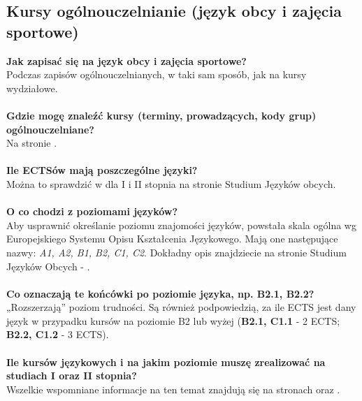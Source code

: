\documentclass[11pt]{article}
\begin{document}
\subsection{Kursy ogólnouczelnianie (język obcy i zajęcia sportowe)}
\textbf{Jak zapisać się na język obcy i zajęcia sportowe?} \\
\indent Podczas zapisów ogólnouczelnianych, w taki sam sposób, jak na kursy wydziałowe. \\\\
\textbf{Gdzie mogę znaleźć kursy (terminy, prowadzących, kody grup) ogólnouczelniane?} \\
\indent Na stronie   
{}. \\\\
\textbf{Ile ECTSów mają poszczególne języki?}\\
\indent Można to sprawdzić w {} dla I i II stopnia na stronie Studium Języków obcych.\\\\
\textbf{O co chodzi z poziomami języków? }\\
\indent Aby usprawnić określanie poziomu znajomości języków, powstała skala ogólna wg Europejskiego Systemu Opisu Kształcenia Językowego. Mają one następujące nazwy: \textit{A1, A2, B1, B2, C1, C2}. Dokładny opis znajdziecie na stronie Studium Języków Obcych -  {}.\\\\ 
\textbf{Co oznaczają te końcówki po poziomie języka, np. B2.1, B2.2?}\\
\indent „Rozszerzają” poziom trudności. Są również podpowiedzią, za ile ECTS jest dany język w przypadku kursów na poziomie B2 lub wyżej (\textbf{B2.1, C1.1} - 2 ECTS; \textbf{B2.2, C1.2} - 3 ECTS).\\\\
\textbf{Ile kursów językowych i na jakim poziomie muszę zrealizować na studiach I oraz II stopnia?} \\
\indent Wszelkie wspomniane informacje na ten temat znajdują się na stronach 
{} oraz  {}.\\
\end{document}
